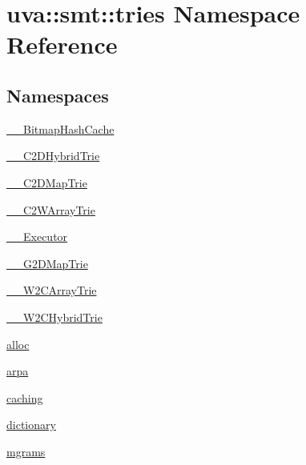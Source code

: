 \hypertarget{namespaceuva_1_1smt_1_1tries}{}\section{uva\+:\+:smt\+:\+:tries Namespace Reference}
\label{namespaceuva_1_1smt_1_1tries}
\subsection*{Namespaces}
\begin{DoxyCompactItemize}
\item 
 \hyperlink{namespaceuva_1_1smt_1_1tries_1_1_____bitmap_hash_cache}{\+\_\+\+\_\+\+Bitmap\+Hash\+Cache}
\item 
 \hyperlink{namespaceuva_1_1smt_1_1tries_1_1_____c2_d_hybrid_trie}{\+\_\+\+\_\+\+C2\+D\+Hybrid\+Trie}
\item 
 \hyperlink{namespaceuva_1_1smt_1_1tries_1_1_____c2_d_map_trie}{\+\_\+\+\_\+\+C2\+D\+Map\+Trie}
\item 
 \hyperlink{namespaceuva_1_1smt_1_1tries_1_1_____c2_w_array_trie}{\+\_\+\+\_\+\+C2\+W\+Array\+Trie}
\item 
 \hyperlink{namespaceuva_1_1smt_1_1tries_1_1_____executor}{\+\_\+\+\_\+\+Executor}
\item 
 \hyperlink{namespaceuva_1_1smt_1_1tries_1_1_____g2_d_map_trie}{\+\_\+\+\_\+\+G2\+D\+Map\+Trie}
\item 
 \hyperlink{namespaceuva_1_1smt_1_1tries_1_1_____w2_c_array_trie}{\+\_\+\+\_\+\+W2\+C\+Array\+Trie}
\item 
 \hyperlink{namespaceuva_1_1smt_1_1tries_1_1_____w2_c_hybrid_trie}{\+\_\+\+\_\+\+W2\+C\+Hybrid\+Trie}
\item 
 \hyperlink{namespaceuva_1_1smt_1_1tries_1_1alloc}{alloc}
\item 
 \hyperlink{namespaceuva_1_1smt_1_1tries_1_1arpa}{arpa}
\item 
 \hyperlink{namespaceuva_1_1smt_1_1tries_1_1caching}{caching}
\item 
 \hyperlink{namespaceuva_1_1smt_1_1tries_1_1dictionary}{dictionary}
\item 
 \hyperlink{namespaceuva_1_1smt_1_1tries_1_1mgrams}{mgrams}
\end{DoxyCompactItemize}
